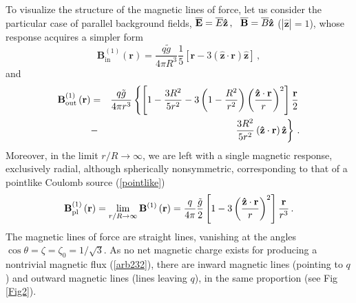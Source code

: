 \documentclass[12pt]{article}
\begin{document}
To visualize the structure of the magnetic lines of force, let us consider
the particular case of parallel background fields, $\overline{\mathbf{E}}=%
\overline{E}\mathbf{\hat{z}}\,,\ \ \mathbf{\overline{B}}=\overline{B}\mathbf{%
\hat{z}}$ ($\left\vert \mathbf{\hat{z}}\right\vert =1$), whose response
acquires a simpler form%
\begin{equation}
\mathbf{B}_{\mathrm{in}}^{\left( 1\right) }\left( \mathbf{r}\right) =\frac{q%
\tilde{g}}{4\pi R^{3}}\frac{1}{5}\left[ \mathbf{r}-3\left( \mathbf{\hat{z}}%
\cdot \mathbf{r}\right) \mathbf{\hat{z}}\right] \,,  \label{arb23.1}
\end{equation}%
and%
\begin{eqnarray}
\mathbf{B}_{\mathrm{out}}^{\left( 1\right) }\left( \mathbf{r}\right) &=&%
\frac{q\tilde{g}}{4\pi r^{3}}\left\{ \left[ 1-\frac{3R^{2}}{5r^{2}}-3\left(
1-\frac{R^{2}}{r^{2}}\right) \left( \frac{\mathbf{\hat{z}}\cdot \mathbf{r}}{r%
}\right) ^{2}\right] \frac{\mathbf{r}}{2}\right.  \notag \\
&-&\left. \frac{3R^{2}}{5r^{2}}\left( \mathbf{\hat{z}}\cdot \mathbf{r}%
\right) \mathbf{\hat{z}}\right\} \,.  \label{arb23.2}
\end{eqnarray}%
Moreover, in the limit $r/R\rightarrow \infty $, we are left with a single
magnetic response, exclusively radial, although spherically nonsymmetric,
corresponding to that of a pointlike Coulomb source (\ref{pointlike})%
\begin{equation}
\mathbf{B}_{\mathrm{pl}}^{\left( 1\right) }\left( \mathbf{r}\right)
=\lim_{r/R\rightarrow \infty }\mathbf{B}^{\left( 1\right) }\left( \mathbf{r}%
\right) =\frac{q}{4\pi }\frac{\tilde{g}}{2}\left[ 1-3\left( \frac{\mathbf{%
\hat{z}}\cdot \mathbf{r}}{r}\right) ^{2}\right] \frac{\mathbf{r}}{r^{3}}\,.
\label{ansa20}
\end{equation}%
The magnetic lines of force are straight lines, vanishing at the angles $%
\cos \theta =\zeta =\zeta _{0}=1/\sqrt{3}$. As no net magnetic charge exists
for producing a nontrivial magnetic flux (\ref{arb232}), there are inward
magnetic lines (pointing to $q$) and outward magnetic lines (lines leaving $%
q $), in the same proportion (see Fig \ref{Fig2}).
\end{document}
